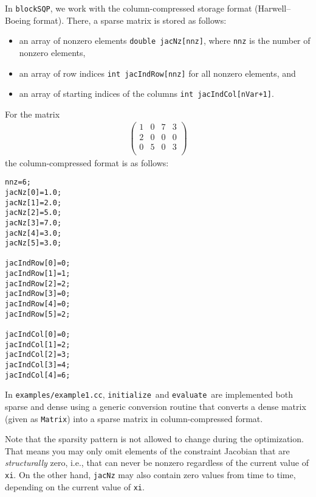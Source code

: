 \documentclass[	11pt,
				a4paper,
				abstract=true,
				twoside=true,
				bibliography=totoc, 
				headinclude=true,
				footinclude=false]{scrartcl}
\newcommand{\blockSQP}{\texttt{blockSQP}}
\newcommand{\init}{\texttt{initialize}}
\newcommand{\evaluate}{\texttt{evaluate}}
\begin{document}
In \blockSQP, we work with the column-compressed storage format (Harwell--Boeing format). There, a sparse matrix is stored as follows:
\begin{itemize}
\item an array of nonzero elements \texttt{double jacNz[nnz]}, where \texttt{nnz} is the number of nonzero elements,
\item an array of row indices \texttt{int jacIndRow[nnz]} for all nonzero elements, and
\item an array of starting indices of the columns \texttt{int jacIndCol[nVar+1]}.
\end{itemize}
For the matrix
\begin{align*}
\begin{pmatrix}
1 & 0 & 7 & 3 \\
2 & 0 & 0 & 0 \\
0 & 5 & 0 & 3 \\
\end{pmatrix}
\end{align*}
the column-compressed format is as follows:
\lstset{style=myC}
\begin{lstlisting}
nnz=6;
jacNz[0]=1.0;
jacNz[1]=2.0;
jacNz[2]=5.0;
jacNz[3]=7.0;
jacNz[4]=3.0;
jacNz[5]=3.0;

jacIndRow[0]=0;
jacIndRow[1]=1;
jacIndRow[2]=2;
jacIndRow[3]=0;
jacIndRow[4]=0;
jacIndRow[5]=2;

jacIndCol[0]=0;
jacIndCol[1]=2;
jacIndCol[2]=3;
jacIndCol[3]=4;
jacIndCol[4]=6;
\end{lstlisting}
In \texttt{examples/example1.cc}, \init\ and \evaluate\ are implemented both sparse and dense using a generic conversion routine that converts a dense matrix (given as \texttt{Matrix}) into a sparse matrix in column-compressed format.

Note that the sparsity pattern is not allowed to change during the optimization. That means you may only omit elements of the constraint Jacobian that are \emph{structurally} zero, i.e., that can never be nonzero regardless of the current value of \texttt{xi}. On the other hand, \texttt{jacNz} may also contain zero values from time to time, depending on the current value of \texttt{xi}.

\end{document}
